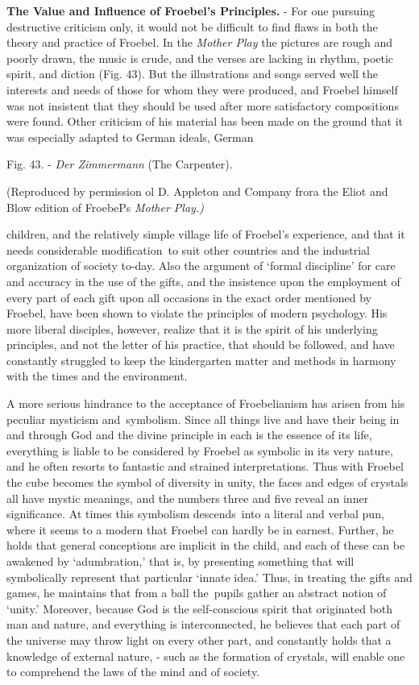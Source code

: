 \documentclass[
]{book}
\begin{document}
\textbf{The Value and Influence of Froebel's Principles.} - For one pursuing destructive criticism only, it would not be difficult to find flaws in both the theory and practice of Froebel. In the \emph{Mother Play} the pictures are rough and poorly drawn, the music is crude, and the verses are lacking in rhythm, poetic spirit, and diction (Fig. 43). But the illustrations and songs served well the interests and needs of those for whom they were produced, and Froebel himself was not insistent that they should be used after more satisfactory compositions were found. Other criticism of his material has been made on the ground that it was especially adapted to German ideals, German

Fig. 43. - \emph{Der Zimmermann} (The Carpenter).

(Reproduced by permission ol D. Appleton and Company frora the Eliot and Blow edition of FroebePs \emph{Mother Play.)}

children, and the relatively simple village life of Froebel's experience, and that it needs considerable modification~to suit other countries and the industrial organization of society to-day. Also the argument of `formal discipline' for care and accuracy in the use of the gifts, and the insistence upon the employment of every part of each gift upon all occasions in the exact order mentioned by Froebel, have been shown to violate the principles of modern psychology. His more liberal disciples, however, realize that it is the spirit of his underlying principles, and not the letter of his practice, that should be followed, and have constantly struggled to keep the kindergarten matter and methods in harmony with the times and the environment.

A more serious hindrance to the acceptance of Froebelianism has arisen from his peculiar mysticism and~symbolism. Since all things live and have their being in and through God and the divine principle in each is the essence of its life, everything is liable to be considered by Froebel as symbolic in its very nature, and he often resorts to fantastic and strained interpretations. Thus with Froebel the cube becomes the symbol of diversity in unity, the faces and edges of crystals all have mystic meanings, and the numbers three and five reveal an inner significance. At times this symbolism descends~into a literal and verbal pun, where it seems to a modern that Froebel can hardly be in earnest. Further, he holds that general conceptions are implicit in the child, and each of these can be awakened by `adumbration,' that is, by presenting something that will symbolically represent that particular `innate idea.' Thus, in treating the gifts and games, he maintains that from a ball the~pupils gather an abstract notion of `unity.' Moreover, because God is the self-conscious spirit that originated both man and nature, and everything is interconnected, he believes that each part of the universe may throw light on every other part, and constantly holds that a knowledge of external nature, - such as the formation of crystals, will enable one to comprehend the laws of the mind and of society.
\end{document}
